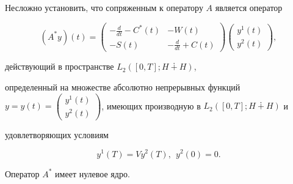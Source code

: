 Несложно установить, что сопряженным к оператору $A$ является оператор


$$


(A^{*}y)(t)= 


\begin{pmatrix}


-\frac{d}{dt}-C^{*}(t)&-W(t)\\ -S(t)&-\frac{d}{dt}+C(t)


\end{pmatrix}


\begin{pmatrix}


y^{1}(t)\\ y^{2}(t)


\end{pmatrix}


,


$$


действующий в пространстве $L_{2}([0,T];H\dotplus H)$,


определенный на множестве абсолютно непрерывных функций $y=y(t)=


\left(\begin{smallmatrix}y^{1}(t)\\ y^{2}(t)\end{smallmatrix}


\right)$, имеющих производную в $L_{2}([0,T];H\dotplus H)$ и


удовлетворяющих условиям


\begin{equation}


y^{1}(T)=Vy^{2}(T),\ \ y^{2}(0)=0.


\end{equation}





\begin{lem}


Оператор $A^{*}$ имеет нулевое ядро.


\end{lem}





